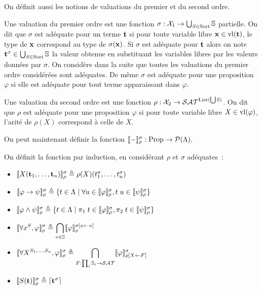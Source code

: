 \documentclass{article}
\begin{document}
On définit aussi les notions de valuations du premier et du second ordre.

\begin{defi}[Valuation]
  Une valuation du premier ordre est une fonction $\sigma : \mathcal X_1 \to \bigcup_{S \in \mathrm{Sort}}\mathbb{S}$ partielle. On dit que $\sigma$ est adéquate pour un terme $\mathbf{t}$ si pour toute variable libre $\mathbf{x}\in \mathrm{vl}(\mathbf{t})$, le type de $\mathbf{x}$ correspond au type de $\sigma(\mathbf{x})$. Si $\sigma$ est adéquate pour $\mathbf{t}$ alors on note $\mathbf{t}^\sigma \in \bigcup_{S\in\mathrm{Sort}}\mathbb{S}$ la valeur obtenue en substituant les variables libres par les valeurs données par $\sigma$. On considère dans la suite que toutes les valuations du premier ordre considérées sont adéquates. De même $\sigma$ est adéquate pour une proposition $\varphi$ si elle est adéquate pour tout terme apparaissant dans $\varphi$.

  Une valuation du second ordre est une fonction $\rho : \mathcal X_2\to \mathcal {SAT}^{\mathrm{List}(\bigcup \mathbb{S})}$. On dit que $\rho$ est adéquate pour une proposition $\varphi$ si pour toute variable libre $X\in\mathrm{vl}(\varphi)$, l'arité de $\rho(X)$ correspond à celle de $X$.
\end{defi}

On peut maintenant définir la fonction $\llbracket - \rrbracket_\rho^\sigma : \mathrm{Prop} \to \mathcal P(\Lambda)$.

\begin{defi}[Interprétation]
  On définit la fonction par induction, en considérant $\rho$ et $\sigma$ adéquates~:
  \begin{itemize}
  \item $\llbracket X(\mathbf{t}_1,\ldots,\mathbf{t}_n) \rrbracket_\rho^\sigma \triangleq \rho(X)(t_1^\sigma,\ldots,t_n^\sigma)$
  \item $\llbracket \varphi\to\psi \rrbracket_\rho^\sigma\triangleq \{t\in\Lambda\mid \forall u \in \llbracket \varphi \rrbracket_\rho^\sigma, t\;u\in\llbracket \psi \rrbracket_\rho^\sigma\}$
  \item $\llbracket \varphi\land \psi \rrbracket_\rho^\sigma \triangleq \{t\in \Lambda\mid \pi_1\;t\in\llbracket \varphi \rrbracket_\rho^\sigma, \pi_2\;t\in\llbracket \psi \rrbracket_\rho^\sigma\}$
  \item $\displaystyle\llbracket \forall x^S, \varphi \rrbracket_\rho^\sigma \triangleq \bigcap_{v \in \mathbb{S}}\llbracket \varphi \rrbracket_\rho^{\sigma[x \leftarrow v]}$
  \item $\displaystyle\llbracket \forall X^{S_1,\ldots,S_n}, \varphi \rrbracket_\rho^\sigma\triangleq\bigcap_{F : \prod_i \mathbb{S}_i \to \mathcal {SAT}}\llbracket \varphi \rrbracket_{\rho[X \leftarrow F]}^\sigma$
  \item $\llbracket S(\mathbf{t}) \rrbracket_\rho^\sigma \triangleq \lceil \mathbf{t}^\sigma \rceil$
  \end{itemize}
\end{defi}
\end{document}
